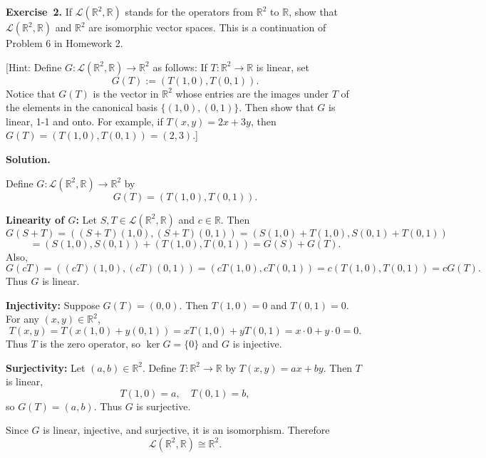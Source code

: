 \documentclass[11pt]{article}
\newcommand{\ProblemAnnounce}{\noindent}
\newcommand{\SolutionAnnounce}{\noindent\textbf{Solution.}\par\medskip}
\newcommand{\Exercise}[1]{\textbf{Exercise~#1.}\;}
\newcommand{\R}{\mathbb{R}}
\begin{document}
\begin{problemBox}
\ProblemAnnounce
\Exercise{2}
If \(\mathcal{L}(\R^2,\R)\) stands for the operators from \(\R^2\) to \(\R\), show that \(\mathcal{L}(\R^2,\R)\) and \(\R^2\) are isomorphic vector spaces. This is a continuation of Problem 6 in Homework 2.

[Hint: Define \(G:\mathcal{L}(\R^2,\R) \longrightarrow \R^2\) as follows: If \(T:\R^2 \longrightarrow \R\) is linear, set
\[
G(T) := (T(1,0), T(0,1)).
\]
Notice that \(G(T)\) is the vector in \(\R^2\) whose entries are the images under \(T\) of the elements in the canonical basis \(\{(1,0),(0,1)\}\). Then show that \(G\) is linear, 1-1 and onto. For example, if \(T(x,y) = 2x + 3y\), then \(G(T) = (T(1,0),T(0,1)) = (2,3)\).]
\end{problemBox}

\begin{solutionBox}
\SolutionAnnounce
\doublespacing

Define \(G: \mathcal{L}(\R^2,\R) \to \R^2\) by
\[
G(T) = (T(1,0), T(0,1)).
\]

\noindent \textbf{Linearity of \(G\):}
Let \(S,T \in \mathcal{L}(\R^2,\R)\) and \(c \in \R\). Then
\[
G(S+T) = ((S+T)(1,0), (S+T)(0,1)) = (S(1,0)+T(1,0), S(0,1)+T(0,1))
\]
\[
= (S(1,0), S(0,1)) + (T(1,0), T(0,1)) = G(S) + G(T).
\]
Also,
\[
G(cT) = ((cT)(1,0), (cT)(0,1)) = (c T(1,0), c T(0,1))
= c (T(1,0), T(0,1)) = c G(T).
\]
Thus \(G\) is linear.

\noindent \textbf{Injectivity:}
Suppose \(G(T) = (0,0)\). Then \(T(1,0) = 0\) and \(T(0,1) = 0\). For any \((x,y) \in \R^2\),
\[
T(x,y) = T(x(1,0) + y(0,1)) = x T(1,0) + y T(0,1) = x\cdot 0 + y\cdot 0 = 0.
\]
Thus \(T\) is the zero operator, so \(\ker G = \{0\}\) and \(G\) is injective.

\noindent \textbf{Surjectivity:}
Let \((a,b) \in \R^2\). Define \(T: \R^2 \to \R\) by \(T(x,y) = ax + by\). Then \(T\) is linear,
\[
T(1,0) = a,\quad T(0,1) = b,
\]
so \(G(T) = (a,b)\). Thus \(G\) is surjective.

Since \(G\) is linear, injective, and surjective, it is an isomorphism. Therefore
\[
\mathcal{L}(\R^2,\R) \cong \R^2.
\]

\end{solutionBox}
\end{document}
